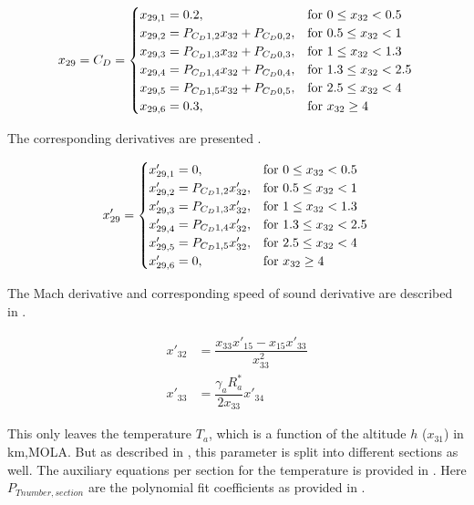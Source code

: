\begin{equation}\label{eq:cdCond}
x_{29}=C_{D}=\begin{cases}
x_{29,1}=0.2, & \text{for } 0\leq x_{32} < 0.5\\
x_{29,2}=P_{C_{D} 1,2}x_{32}+P_{C_{D} 0,2}, &  \text{for } 0.5\leq x_{32} < 1 \\
x_{29,3}=P_{C_{D} 1,3}x_{32}+P_{C_{D} 0,3}, &  \text{for } 1\leq x_{32} < 1.3 \\
x_{29,4}=P_{C_{D} 1,4}x_{32}+P_{C_{D} 0,4}, &  \text{for } 1.3\leq x_{32} < 2.5 \\
x_{29,5}=P_{C_{D} 1,5}x_{32}+P_{C_{D} 0,5}, &  \text{for } 2.5\leq x_{32} < 4 \\
x_{29,6}=0.3, &  \text{for } x_{32} \geq 4 
\end{cases}\\
\end{equation}

The corresponding derivatives are presented .

\begin{equation}\label{eq:cdCondDer}
x'_{29}=\begin{cases}
x'_{29,1}=0, & \text{for } 0\leq x_{32} < 0.5\\
x'_{29,2}=P_{C_{D} 1,2}x'_{32}, &  \text{for } 0.5\leq x_{32} < 1 \\
x'_{29,3}=P_{C_{D} 1,3}x'_{32}, &  \text{for } 1\leq x_{32} < 1.3 \\
x'_{29,4}=P_{C_{D} 1,4}x'_{32}, &  \text{for } 1.3\leq x_{32} < 2.5 \\
x'_{29,5}=P_{C_{D} 1,5}x'_{32}, &  \text{for } 2.5\leq x_{32} < 4 \\
x'_{29,6}=0, &  \text{for } x_{32} \geq 4 
\end{cases}\\
\end{equation}

The Mach derivative and corresponding speed of sound derivative are described in .

 \begin{equation} \label{eq:cdDerAux}
\begin{split}
x'_{32} &= \dfrac{x_{33}x'_{15}-x_{15}x'_{33}}{x_{33}^{2}}\\
x'_{33} &= \dfrac{\gamma_{a}R_{a}^{*}}{2x_{33}}x'_{34} 
\end{split}
\end{equation}

This only leaves the temperature $T_{a}$, which is a function of the altitude $h$ ($x_{31}$) in km,\ac{MOLA}. But as described in , this parameter is split into different sections as well. The auxiliary equations per section for the temperature is provided in . Here $P_{T number,section}$ are the polynomial fit coefficients as provided in .

